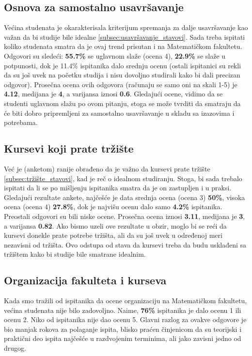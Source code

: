 \documentclass[a4paper]{article}
\begin{document}
{\subsection{Osnova za samostalno usavršavanje}
\label{subsec:usavršavanje_iskustva}
Većina studenata je okarakterisala kriterijum spremanja za dalje usavršavanje kao važan da bi studije bile idealne \ref{subsec:usavršavanje_stavovi}. Sada treba ispitati koliko studenata smatra da je ovaj trend prisutan i na Matematičkom fakultetu.
Odgovori su sledeći: \textbf{55.7\%} se uglavnom slaže (ocena 4), \textbf{22.9\%} se slaže u potpunosti, dok je 11.4\% ispitanika dalo srednju ocenu (ostali ispitanici su rekli da su još uvek na početku studija i nisu dovoljno studirali kako bi dali precizan odgovor). Prosečna ocena ovih odgovora (računaju se samo oni na skali 1-5) je \textbf{4.12}, medijana je \textbf{4}, a varijansa iznosi \textbf{0.6}. Gledajući ocene, vidimo da se studenti uglavnom slažu po ovom pitanju, stoga se može tvrditi da smatraju da će biti dobro pripremljeni za samostalno usavršavanje u skladu sa izazovima i potrebama.


\subsection{Kursevi koji prate tržište}
\label{subsec:tržište_iskustva}

Već je (anketom) ranije obrađeno da je važno da kursevi prate tržište \ref{subsec:tržište_stavovi}, kad je reč o idealnom studiranju. Stoga, bi sada trebalo ispitati da li se po mišljenju ispitanika smatra da je on zastupljen i u praksi. Gledajući rezultate ankete, najčešće je data srednja ocena (ocena 3) \textbf{50\%}, visoka ocena (ocena 4) \textbf{27.8\%}, dok je najvišu ocenu dalo samo \textbf{4.2\%} ispitanika. Preostali odgovori su bili niske ocene. Prosečna ocena iznosi \textbf{3.11}, medijana je \textbf{3}, a varijansa \textbf{0.82}. Ako bismo uzeli ove rezultate u obzir, moglo bi se reći da kursevi donekle prate potrebe tržišta, ali da su još uvek u određenoj meri nezavisni od tržišta. Ovo odstupa od stava da kursevi treba da budu usklađeni sa tržištem kako bi studije bile smatrane idealnim.

\subsection{Organizacija fakulteta i kurseva}
\label{subsec:organizacija_iskustva}

Kada smo tražili od ispitanika da ocene organizaciju na Matematičkom fakultetu, većina studenata nije bilo zadovoljno. Naime, \textbf{76\%} ispitanika je dalo ocenu 1 ili ocenu 2. Niko od ispitanika nije dao ocenu 5. Glavni razlog za ovakve odgovore je bio manjak rokova za polaganje ispita, blisko praćen činjenicom da su teorijski i praktični deo ispita najčešće u razdvojenim terminima, ali jako zavisni jedno od drugog.

}
\end{document}
